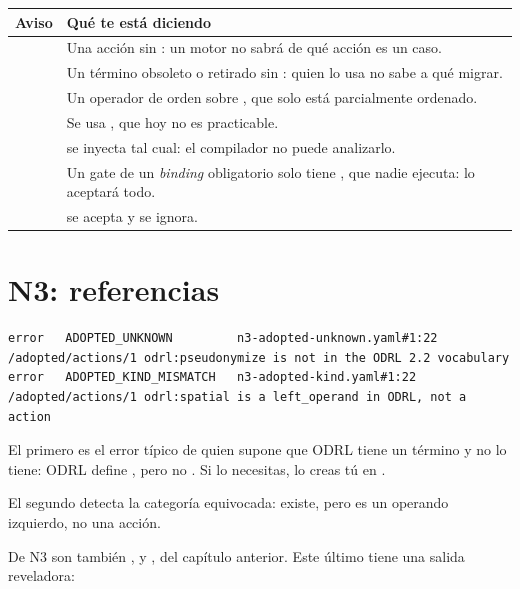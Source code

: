 \noindent\begin{tabularx}{\linewidth}{@{}L{6.3cm}Y@{}}
\toprule
\textbf{Aviso} & \textbf{Qué te está diciendo} \\
\midrule
{} & Una acción sin : un motor no sabrá de qué acción es un caso. \\
 & Un término obsoleto o retirado sin : quien lo usa no sabe a qué migrar. \\
 & Un operador de orden sobre , que solo está parcialmente ordenado. \\
 & Se usa , que hoy no es practicable. \\
 &  se inyecta tal cual: el compilador no puede analizarlo. \\
 & Un gate de un \emph{binding} obligatorio solo tiene , que nadie ejecuta: lo aceptará todo. \\
 &  se acepta y se ignora. \\
\bottomrule
\end{tabularx}

\section{N3: referencias}

\begin{lstlisting}[style=out]
error   ADOPTED_UNKNOWN         n3-adopted-unknown.yaml#1:22 /adopted/actions/1 odrl:pseudonymize is not in the ODRL 2.2 vocabulary
error   ADOPTED_KIND_MISMATCH   n3-adopted-kind.yaml#1:22 /adopted/actions/1 odrl:spatial is a left_operand in ODRL, not a action
\end{lstlisting}

El primero es el error típico de quien supone que ODRL tiene un término y no lo tiene: ODRL define
, pero no . Si lo necesitas, lo creas tú en .

El segundo detecta la categoría equivocada:  existe, pero es un operando izquierdo, no una
acción.

De N3 son también ,  y , del capítulo
anterior. Este último tiene una salida reveladora:

